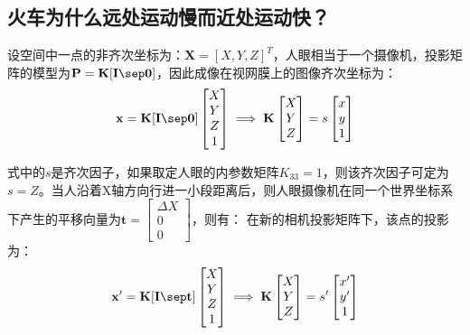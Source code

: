 \documentclass[11pt]{article}
\begin{document}
\subsection{火车为什么远处运动慢而近处运动快？}
\label{subsec:火车为什么远处运动慢而近处运动快？}
\par
设空间中一点的非齐次坐标为：$\mathbf{X}=[X,Y,Z]^T$，人眼相当于一个摄像机，投影矩阵的模型为$\mathbf{P=K[I\sep 0]}$，因此成像在视网膜上的图像齐次坐标为：
\begin{equation*}
  \mathbf{x}=\mathbf{K[I\sep 0]}\begin{bmatrix}
    X \\Y\\Z\\1
  \end{bmatrix}\implies \mathbf{K}\begin{bmatrix}
    X \\Y\\Z
  \end{bmatrix}=s\begin{bmatrix}
    x \\y\\1
  \end{bmatrix}
\end{equation*}\par
式中的$s$是齐次因子，如果取定人眼的内参数矩阵$K_{33}=1$，则该齐次因子可定为$s={Z}$。当人沿着X轴方向行进一小段距离后，则人眼摄像机在同一个世界坐标系下产生的平移向量为$\mathbf{t}=\begin{bmatrix}
    \Delta X \\0\\0
  \end{bmatrix}$，则有：
在新的相机投影矩阵下，该点的投影为：
\begin{equation*}
  \mathbf{x}'=\mathbf{K[I\sep t]}\begin{bmatrix}
    X \\Y\\Z\\1
  \end{bmatrix}\implies \mathbf{K}\begin{bmatrix}
    X \\Y\\Z
  \end{bmatrix}=s'\begin{bmatrix}
    x' \\y'\\1
  \end{bmatrix}
\end{equation*}\par
\end{document}

